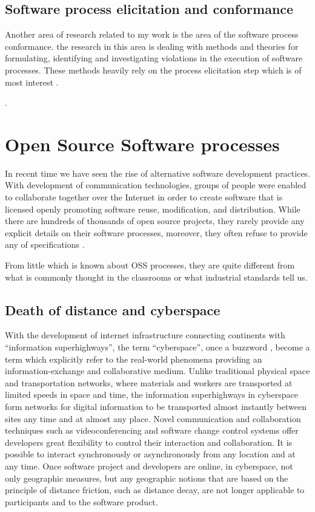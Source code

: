 \subsection{Software process elicitation and conformance}
Another area of research related to my work is the area of the software process conformance. 
the research in this area is dealing with methods and theories for formulating, identifying and
investigating violations in the execution of software processes. These methods heavily rely
on the process elicitation step which is of most interest . 

.

\section{Open Source Software processes}\label{oss.processes}
In recent time we have seen the rise of alternative software development practices. 
With development of communication technologies, groups of people were 
enabled to collaborate together over the Internet in order to create software that is 
licensed openly promoting software reuse, modification, and distribution. While there are 
hundreds of thousands of open source projects, they rarely provide any explicit details on 
their software processes, moreover, they often refuse to provide any of 
specifications \cite{Torvalds:2005}. 

From little which is known about OSS processes, they are quite different from what is 
commonly thought in the classrooms or what industrial standards tell us.

\subsection{Death of distance and cyberspace}
With the development of internet infrastructure connecting continents with ``information
superhighways'', the term ``cyberspace'', once a buzzword \cite{citeulike:11095763}, become 
a term which explicitly refer to the real-world phenomena providing an information-exchange
and collaborative medium. Unlike traditional physical space and transportation networks, where 
materials and workers are transported at limited speeds in space and time, the information 
superhighways in cyberspace form networks for digital information to be transported almost instantly 
between sites any time and at almost any place. 
Novel communication and collaboration techniques such as videoconferencing and software change 
control systems offer developers great flexibility to control their interaction and collaboration. 
It is possible to interact synchronously or asynchronously from any location and at any time. 
Once software project and developers are online, in cyberspace, not only geographic measures, but 
any geographic notions that are based on the principle of distance friction, such as distance decay,
are not longer applicable to participants and to the software product.

